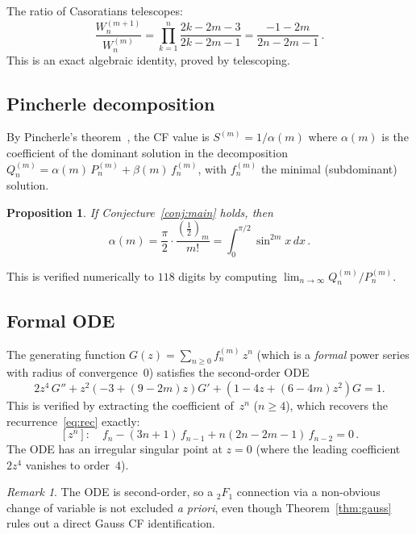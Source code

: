 \documentclass[11pt]{article}
\newcommand{\half}{\tfrac{1}{2}}
\newtheorem{proposition}[theorem]{Proposition}
\theoremstyle{definition}
\theoremstyle{remark}
\newtheorem{remark}[theorem]{Remark}
\begin{document}
The ratio of Casoratians telescopes:
\begin{equation}\label{eq:casratio}
  \frac{W_n^{(m+1)}}{W_n^{(m)}}
  = \prod_{k=1}^n \frac{2k{-}2m{-}3}{2k{-}2m{-}1}
  = \frac{-1{-}2m}{2n{-}2m{-}1}\,.
\end{equation}
This is an exact algebraic identity, proved by telescoping.

\subsection{Pincherle decomposition}

By Pincherle's theorem~\cite[Thm.~20.1]{jones1980continued},
the CF value is $S^{(m)} = 1/\alpha(m)$
where $\alpha(m)$ is the coefficient of the dominant solution
in the decomposition
$Q_n^{(m)} = \alpha(m)\,P_n^{(m)} + \beta(m)\,f_n^{(m)}$,
with $f_n^{(m)}$ the minimal (subdominant) solution.

\begin{proposition}\label{prop:alpha}
If Conjecture~\ref{conj:main} holds, then
\[
  \alpha(m) = \frac{\pi}{2}\cdot\frac{(\half)_m}{m!}
  = \int_0^{\pi/2}\!\sin^{2m}x\,dx\,.
\]
\end{proposition}

This is verified numerically to $118$ digits by computing
$\lim_{n\to\infty} Q_n^{(m)}/P_n^{(m)}$.

\subsection{Formal ODE}

The generating function $G(z) = \sum_{n\geq 0} f_n^{(m)}\,z^n$
(which is a \emph{formal} power series with radius of convergence~$0$)
satisfies the second-order ODE
\begin{equation}\label{eq:ode}
  2z^4\,G'' + z^2\!\left(-3 + (9{-}2m)z\right)G'
  + \left(1 - 4z + (6{-}4m)z^2\right)G = 1.
\end{equation}
This is verified by extracting the coefficient of~$z^n$
($n \geq 4$), which recovers the recurrence~\eqref{eq:rec} exactly:
\[
  [z^n]:\quad f_n - (3n{+}1)\,f_{n-1} + n(2n{-}2m{-}1)\,f_{n-2} = 0\,.
\]
The ODE has an irregular singular point at $z=0$ (where the
leading coefficient $2z^4$ vanishes to order~$4$).

\begin{remark}
The ODE is second-order, so a ${}_2F_1$ connection via
a non-obvious change of variable is not excluded \emph{a priori},
even though Theorem~\ref{thm:gauss} rules out a direct
Gauss CF identification.
\end{remark}
\end{document}
